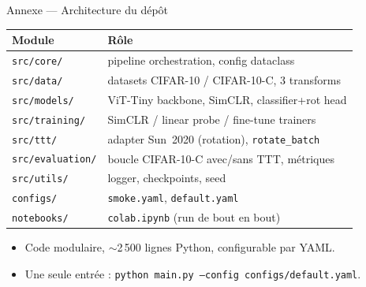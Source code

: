 \documentclass[10pt,aspectratio=169]{beamer}
\newcommand{\code}[1]{\texttt{\small #1}}
\begin{document}
\begin{frame}{Annexe --- Architecture du dépôt}
  \centering
  \small
  \begin{tabular}{ll}
    \toprule
    Module & Rôle \\
    \midrule
    \code{src/core/}        & pipeline orchestration, config dataclass \\
    \code{src/data/}        & datasets CIFAR-10 / CIFAR-10-C, 3 transforms \\
    \code{src/models/}      & ViT-Tiny backbone, SimCLR, classifier+rot head \\
    \code{src/training/}    & SimCLR / linear probe / fine-tune trainers \\
    \code{src/ttt/}         & adapter Sun~2020 (rotation), \code{rotate\_batch} \\
    \code{src/evaluation/}  & boucle CIFAR-10-C avec/sans TTT, métriques \\
    \code{src/utils/}       & logger, checkpoints, seed \\
    \code{configs/}         & \code{smoke.yaml}, \code{default.yaml} \\
    \code{notebooks/}       & \code{colab.ipynb} (run de bout en bout) \\
    \bottomrule
  \end{tabular}

  \vspace{0.6em}
  \begin{itemize}\footnotesize
    \item Code modulaire, $\sim$2\,500 lignes Python, configurable par YAML.
    \item Une seule entrée : \code{python main.py --config configs/default.yaml}.
  \end{itemize}
\end{frame}
\end{document}
